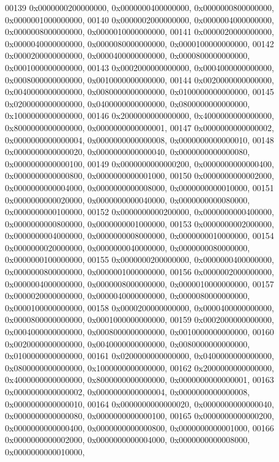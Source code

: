 \begin{DoxyCode}
00139         0x0000000200000000, 0x0000000400000000, 0x0000000800000000, 0x0000001000000000,
00140         0x0000002000000000, 0x0000004000000000, 0x0000008000000000, 0x0000010000000000,
00141         0x0000020000000000, 0x0000040000000000, 0x0000080000000000, 0x0000100000000000,
00142         0x0000200000000000, 0x0000400000000000, 0x0000800000000000, 0x0001000000000000,
00143         0x0002000000000000, 0x0004000000000000, 0x0008000000000000, 0x0010000000000000,
00144         0x0020000000000000, 0x0040000000000000, 0x0080000000000000, 0x0100000000000000,
00145         0x0200000000000000, 0x0400000000000000, 0x0800000000000000, 0x1000000000000000,
00146         0x2000000000000000, 0x4000000000000000, 0x8000000000000000, 0x0000000000000001,
00147         0x0000000000000002, 0x0000000000000004, 0x0000000000000008, 0x0000000000000010,
00148         0x0000000000000020, 0x0000000000000040, 0x0000000000000080, 0x0000000000000100,
00149         0x0000000000000200, 0x0000000000000400, 0x0000000000000800, 0x0000000000001000,
00150         0x0000000000002000, 0x0000000000004000, 0x0000000000008000, 0x0000000000010000,
00151         0x0000000000020000, 0x0000000000040000, 0x0000000000080000, 0x0000000000100000,
00152         0x0000000000200000, 0x0000000000400000, 0x0000000000800000, 0x0000000001000000,
00153         0x0000000002000000, 0x0000000004000000, 0x0000000008000000, 0x0000000010000000,
00154         0x0000000020000000, 0x0000000040000000, 0x0000000080000000, 0x0000000100000000,
00155         0x0000000200000000, 0x0000000400000000, 0x0000000800000000, 0x0000001000000000,
00156         0x0000002000000000, 0x0000004000000000, 0x0000008000000000, 0x0000010000000000,
00157         0x0000020000000000, 0x0000040000000000, 0x0000080000000000, 0x0000100000000000,
00158         0x0000200000000000, 0x0000400000000000, 0x0000800000000000, 0x0001000000000000,
00159         0x0002000000000000, 0x0004000000000000, 0x0008000000000000, 0x0010000000000000,
00160         0x0020000000000000, 0x0040000000000000, 0x0080000000000000, 0x0100000000000000,
00161         0x0200000000000000, 0x0400000000000000, 0x0800000000000000, 0x1000000000000000,
00162         0x2000000000000000, 0x4000000000000000, 0x8000000000000000, 0x0000000000000001,
00163         0x0000000000000002, 0x0000000000000004, 0x0000000000000008, 0x0000000000000010,
00164         0x0000000000000020, 0x0000000000000040, 0x0000000000000080, 0x0000000000000100,
00165         0x0000000000000200, 0x0000000000000400, 0x0000000000000800, 0x0000000000001000,
00166         0x0000000000002000, 0x0000000000004000, 0x0000000000008000, 0x0000000000010000,

\end{DoxyCode}
